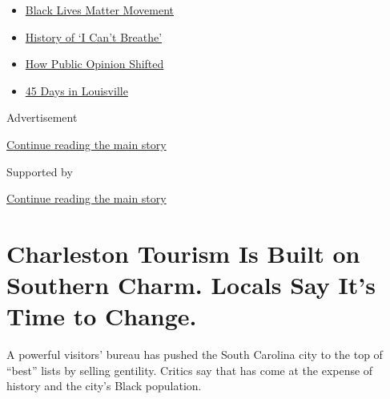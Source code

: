 \begin{itemize}
\tightlist
\item
  \href{https://www.nytimes3xbfgragh.onion/interactive/2020/07/03/us/george-floyd-protests-crowd-size.html?name=styln-george-floyd\&region=TOP_BANNER\&variant=undefined\&block=storyline_menu_recirc\&action=click\&pgtype=Article\&impression_id=c962bd51-e37d-11ea-af8a-cf9df229f915}{Black
  Lives Matter Movement}
\item
  \href{https://www.nytimes3xbfgragh.onion/interactive/2020/06/28/us/i-cant-breathe-police-arrest.html?name=styln-george-floyd\&region=TOP_BANNER\&variant=undefined\&block=storyline_menu_recirc\&action=click\&pgtype=Article\&impression_id=c962bd52-e37d-11ea-af8a-cf9df229f915}{History
  of `I Can't Breathe'}
\item
  \href{https://www.nytimes3xbfgragh.onion/interactive/2020/06/10/upshot/black-lives-matter-attitudes.html?name=styln-george-floyd\&region=TOP_BANNER\&variant=undefined\&block=storyline_menu_recirc\&action=click\&pgtype=Article\&impression_id=c962bd53-e37d-11ea-af8a-cf9df229f915}{How
  Public Opinion Shifted}
\item
  \href{https://www.nytimes3xbfgragh.onion/interactive/2020/07/16/us/black-lives-matter-protests-louisville-breonna-taylor.html?name=styln-george-floyd\&region=TOP_BANNER\&variant=undefined\&block=storyline_menu_recirc\&action=click\&pgtype=Article\&impression_id=c962e460-e37d-11ea-af8a-cf9df229f915}{45
  Days in Louisville}
\end{itemize}

Advertisement

\protect\hyperlink{after-top}{Continue reading the main story}

Supported by

\protect\hyperlink{after-sponsor}{Continue reading the main story}

\hypertarget{charleston-tourism-is-built-on-southern-charm-locals-say-its-time-to-change}{%
\section{Charleston Tourism Is Built on Southern Charm. Locals Say It's
Time to
Change.}\label{charleston-tourism-is-built-on-southern-charm-locals-say-its-time-to-change}}

A powerful visitors' bureau has pushed the South Carolina city to the
top of ``best'' lists by selling gentility. Critics say that has come at
the expense of history and the city's Black population.

